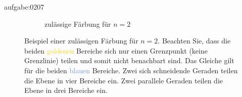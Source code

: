 \begin{aufgabe}{aufgabe:0207}
\begin{figure}[H]
\begin{subfigure}{0.4\textwidth}
        \caption{zulässige Färbung für $n=2$}
        \label{subfig:2linesFilled}
    \end{subfigure}
    \caption{Beispiel einer zulässigen Färbung für $n=2$. Beachten Sie, dass die beiden \textcolor{Gold}{goldenen} Bereiche sich nur einen Grenzpunkt (keine Grenzlinie) teilen und somit nicht benachbart sind. Das Gleiche gilt für die beiden \textcolor{CornflowerBlue}{blauen} Bereiche. Zwei sich schneidende Geraden teilen die Ebene in vier Bereiche ein. Zwei parallele Geraden teilen die Ebene in drei Bereiche ein.}
    \label{fig:2lines}
\end{figure}
\end{aufgabe}

